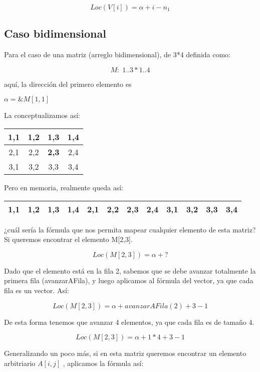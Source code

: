 $$ Loc \left( V[i] \right) =  \alpha + i - n_1$$

\subsection{Caso bidimensional}
\label{sec:caso-bidimensional}

Para el caso de una matriz (arreglo bidimensional), de 3*4 definida
como:

$$M:\; 1..3 * 1..4$$

aquí, la dirección del primero elemento es

$ \alpha = \&M[1,1]$

La conceptualizamos así:

\begin{center}
  \begin{tabular}{|c|c|c|c|}
    \hline
    1,1 & 1,2 & 1,3 & 1,4\\ \hline
    2,1 & 2,2 &	\textbf{2,3} & 2,4\\ \hline
    3,1 & 3,2 &	3,3 & 3,4\\ \hline
  \end{tabular}
\end{center}

Pero en memoria, realmente queda así:
\begin{center}
  \begin{tabular}{|c|c|c|c|c|c|c|c|c|c|c|c|}
    \hline
    1,1&1,2&1,3&1,4&2,1&2,2&\textbf{2,3}&2,4&3,1&3,2&3,3&3,4\\ \hline
  \end{tabular}
\end{center}

¿cuál sería la fórmula que nos permita mapear cualquier elemento de
esta matriz?  Si queremos encontrar el elemento M[2,3].

$$Loc \left( M[2,3]  \right) = \alpha + ?$$

Dado que el elemento está en la fila 2, sabemos que se debe avanzar
totalmente la primera fila (avanzarAFila), y luego aplicamos al
fórmula del vector, ya que cada fila es un vector.  Así:

$$Loc \left( M[2,3] \right) = \alpha + avanzarAFila(2) + 3 - 1$$

De esta forma tenemos que avanzar 4 elementos, ya que cada fila es de
tamaño 4.

$$ Loc \left( M[2,3] \right) = \alpha + 1 * 4 + 3 - 1 $$

Generalizando un poco más, si en esta matriz queremos encontrar un
elemento arbitriario $A[i,j]$ , aplicamos la fórmula así:

